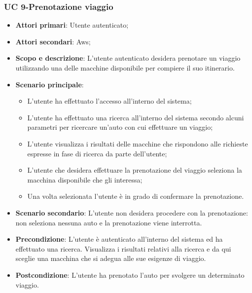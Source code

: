         \subsubsection{UC 9-Prenotazione viaggio}
       \begin{itemize}
        \item \textbf{Attori primari}: Utente autenticato;
        \item \textbf{Attori secondari}: Aws;
        \item \textbf{Scopo e descrizione}: L'utente autenticato desidera prenotare un viaggio utilizzando una delle macchine disponibile per compiere il suo itinerario.
        \item \textbf{Scenario principale}:
            \begin{itemize}
                \item L'utente ha effettuato l'accesso all'interno del sistema;
                \item L'utente ha effettuato una ricerca all'interno del sistema secondo alcuni parametri per ricercare un'auto con cui effettuare un viaggio;
                \item L'utente visualizza i risultati delle macchine che rispondono alle richieste espresse in fase di ricerca da parte dell'utente;
                \item L'utente che desidera effettuare la prenotazione del viaggio seleziona la macchina disponibile che gli interessa;
                \item Una volta selezionata l'utente è in grado di confermare la prenotazione.
            \end{itemize}
        
        \item \textbf{Scenario secondario}: L'utente non desidera procedere con la prenotazione: non seleziona nessuna auto e la prenotazione viene interrotta.
        
        \item \textbf{Precondizione}: L'utente è autenticato all'interno del sistema ed ha effettuato una ricerca. Visualizza i risultati relativi alla ricerca e da qui sceglie una macchina che si adegua alle sue esigenze di viaggio.
        \item \textbf{Postcondizione}: L'utente ha prenotato l'auto per svolgere un determinato viaggio.
        \end{itemize}  
        
